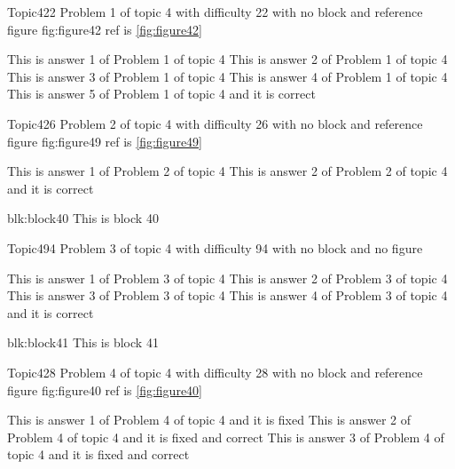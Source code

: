 \documentclass[master]{exam}
\begin{document}
\begin{problem}{Topic4}{22}
	Problem 1 of topic 4 with difficulty 22 with no block and reference figure fig:figure42 ref is \ref{fig:figure42}
	\begin{answers}
		\answer This is answer 1 of Problem 1 of topic 4 
		\answer This is answer 2 of Problem 1 of topic 4 
		\answer This is answer 3 of Problem 1 of topic 4 
		\answer This is answer 4 of Problem 1 of topic 4 
		\answer[correct] This is answer 5 of Problem 1 of topic 4 and it is correct
	\end{answers}
\end{problem}

\begin{problem}{Topic4}{26}
	Problem 2 of topic 4 with difficulty 26 with no block and reference figure fig:figure49 ref is \ref{fig:figure49}
	\begin{answers}
		\answer This is answer 1 of Problem 2 of topic 4 
		\answer[correct] This is answer 2 of Problem 2 of topic 4 and it is correct
	\end{answers}
\end{problem}



\begin{block}{blk:block40}
This is block 40
\end{block}


\begin{problem}{Topic4}{94}
	Problem 3 of topic 4 with difficulty 94 with no block and no figure
	\begin{answers}
		\answer This is answer 1 of Problem 3 of topic 4 
		\answer This is answer 2 of Problem 3 of topic 4 
		\answer This is answer 3 of Problem 3 of topic 4 
		\answer[correct] This is answer 4 of Problem 3 of topic 4 and it is correct
	\end{answers}
\end{problem}



\begin{block}{blk:block41}
This is block 41
\end{block}


\begin{problem}{Topic4}{28}
	Problem 4 of topic 4 with difficulty 28 with no block and reference figure fig:figure40 ref is \ref{fig:figure40}
	\begin{answers}
		\answer[fixed] This is answer 1 of Problem 4 of topic 4 and it is fixed
		 This is answer 2 of Problem 4 of topic 4 and it is fixed and correct
		 This is answer 3 of Problem 4 of topic 4 and it is fixed and correct
	\end{answers}
\end{problem}
\end{document}
